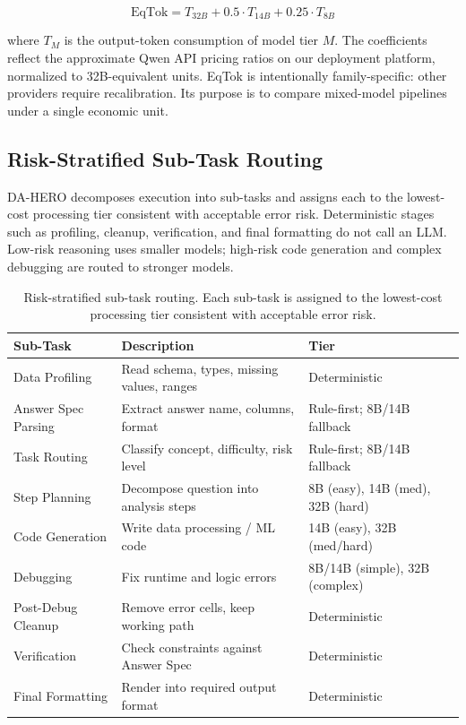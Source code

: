 \documentclass[letterpaper]{article} %
\begin{document}
\begin{equation}
\mathrm{EqTok} = T_{32B} + 0.5 \cdot T_{14B} + 0.25 \cdot T_{8B}
\label{eq:eqtok}
\end{equation}

where $T_M$ is the output-token consumption of model tier $M$.  The coefficients reflect the approximate Qwen API pricing ratios on our deployment platform, normalized to 32B-equivalent units.  EqTok is intentionally family-specific: other providers require recalibration.  Its purpose is to compare mixed-model pipelines under a single economic unit.

\subsection{Risk-Stratified Sub-Task Routing}

DA-HERO decomposes execution into sub-tasks and assigns each to the lowest-cost processing tier consistent with acceptable error risk.  Deterministic stages such as profiling, cleanup, verification, and final formatting do not call an LLM.  Low-risk reasoning uses smaller models; high-risk code generation and complex debugging are routed to stronger models.

\begin{table}[t]
\centering
\caption{Risk-stratified sub-task routing. Each sub-task is assigned to the lowest-cost processing tier consistent with acceptable error risk.}
\label{tab:risk_routing}
\footnotesize
\begin{tabular}{p{}p{}p{}}
\toprule
\textbf{Sub-Task} & \textbf{Description} & \textbf{Tier} \\
\midrule
Data Profiling & Read schema, types, missing values, ranges & Deterministic \\
Answer Spec Parsing & Extract answer name, columns, format & Rule-first; 8B/14B fallback \\
Task Routing & Classify concept, difficulty, risk level & Rule-first; 8B/14B fallback \\
Step Planning & Decompose question into analysis steps & 8B (easy), 14B (med), 32B (hard) \\
Code Generation & Write data processing / ML code & 14B (easy), 32B (med/hard) \\
Debugging & Fix runtime and logic errors & 8B/14B (simple), 32B (complex) \\
Post-Debug Cleanup & Remove error cells, keep working path & Deterministic \\
Verification & Check constraints against Answer Spec & Deterministic \\
Final Formatting & Render into required output format & Deterministic \\
\bottomrule
\end{tabular}
\end{table}
\end{document}
